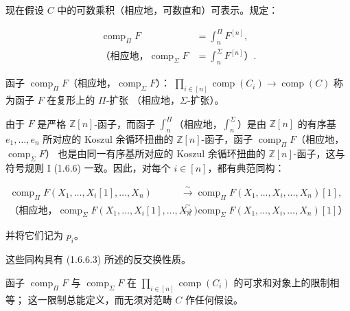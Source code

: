 \clearpage
{}%
现在假设 $C$ 中的可数乘积（相应地，可数直和）可表示。规定：

\begin{equation}
  \begin{aligned}
    \operatorname{comp}_{\Pi}F
      &=\int_n^{\Pi}F^{[n]},\\
    \text{（相应地，}\operatorname{comp}_{\Sigma}F
      &=\int_n^{\Sigma}F^{[n]}\text{）}.
  \end{aligned}
  \tag{2.4.2.6}
\end{equation}

函子
$\operatorname{comp}_{\Pi}F$（相应地，$\operatorname{comp}_{\Sigma}F$）：
$\prod_{i\in[n]}\operatorname{comp}(C_i)\longrightarrow
\operatorname{comp}(C)$ 称为函子 $F$ 在复形上的 $\Pi$-扩张
（相应地，$\Sigma$-扩张）。

由于 $F$ 是严格 $\mathbb Z[n]$-函子，而函子
$\int_n^{\Pi}$（相应地，$\int_n^{\Sigma}$）是由
$\mathbb Z[n]$ 的有序基 $e_1,\ldots,e_n$ 所对应的 Koszul 余循环扭曲的
$\mathbb Z[n]$-函子，函子
$\operatorname{comp}_{\Pi}F$（相应地，$\operatorname{comp}_{\Sigma}F$）
也是由同一有序基所对应的 Koszul 余循环扭曲的
$\mathbb Z[n]$-函子，这与符号规则 I (1.6.6) 一致。因此，对每个
$i\in[n]$，都有典范同构：

\begin{equation}
  \begin{aligned}
    \operatorname{comp}_{\Pi}F(X_1,\ldots,X_i[1],\ldots,X_n)
      &\xrightarrow{\sim}
      \operatorname{comp}_{\Pi}F(X_1,\ldots,X_i,\ldots,X_n)[1],\\
    \text{（相应地，}\operatorname{comp}_{\Sigma}F(X_1,\ldots,X_i[1],\ldots,X_n)
      &\xrightarrow{\sim}
      \operatorname{comp}_{\Sigma}F(X_1,\ldots,X_i,\ldots,X_n)[1]\text{）}
  \end{aligned}
  \tag{2.4.2.7}
\end{equation}

并将它们记为 $p_i$。

这些同构具有 (1.6.6.3) 所述的反交换性质。

函子 $\operatorname{comp}_{\Pi}F$ 与
$\operatorname{comp}_{\Sigma}F$ 在
$\prod_{i\in[n]}\operatorname{comp}(C_i)$ 的可求和对象上的限制相等；
这一限制总能定义，而无须对范畴 $C$ 作任何假设。

